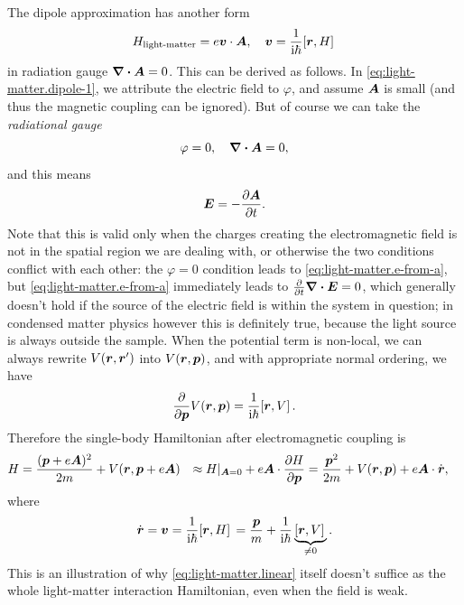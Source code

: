 \documentclass[hyperref, a4paper, 12pt]{report}
\newcommand*{\ii}{\mathrm{i}}
\def\\{}%
\begin{document}
The dipole approximation has another form
\begin{equation}
    H_{\text{light-matter}} = e \vb*{v} \cdot \vb*{A}, 
    \quad \vb*{v} = \frac{1}{\ii \hbar} \comm*{\vb*{r}}{H} 
\end{equation}
in radiation gauge $\div{\vb*{A}} = 0$.
This can be derived as follows. 
In \eqref{eq:light-matter.dipole-1}, 
we attribute the electric field to $\varphi$, 
and assume $\vb*{A}$ is small (and thus the magnetic coupling can be ignored).
But of course we can take the \emph{radiational gauge} 
\begin{equation}
    \varphi = 0, \quad \div{\vb*{A}} = 0,
\end{equation} 
and this means 
\begin{equation}
    \vb*{E} = - \pdv{\vb*{A}}{t}.
    \label{eq:light-matter.e-from-a}
\end{equation}
Note that this is valid only when 
the charges creating the electromagnetic field 
is not in the spatial region we are dealing with,
or otherwise the two conditions conflict with each other: 
the $\varphi = 0$ condition leads to \eqref{eq:light-matter.e-from-a}, 
but \eqref{eq:light-matter.e-from-a} immediately leads to $\pdv{t} \div{\vb*{E}} = 0$, 
which generally doesn't hold if the source of the electric field 
is within the system in question; 
in condensed matter physics however this is definitely true, 
because the light source is always outside the sample.
When the potential term is non-local, 
we can always rewrite $V(\vb*{r}, \vb*{r}')$
into $V(\vb*{r}, \vb*{p})$,
and with appropriate normal ordering, we have 
\[
    \pdv{\vb*{p}} V(\vb*{r}, \vb*{p}) = \frac{1}{\ii \hbar} \comm*{\vb*{r}}{V}.
\]
Therefore the single-body Hamiltonian after electromagnetic coupling is 
\[
    \begin{aligned}
        H &= \frac{(\vb*{p} + e \vb*{A})^2}{2m} 
            + V(\vb*{r} , \vb*{p} + e \vb*{A}) \\
        &\approx H|_{\vb*{A} = 0} + 
            e \vb*{A} \cdot \pdv{H}{\vb*{p}} \\
        &= \frac{\vb*{p}^2}{2m} + V(\vb*{r}, \vb*{p}) + e \vb*{A} \cdot \dot{\vb*{r}},
    \end{aligned}
\]
where 
\begin{equation}
    \dot{\vb*{r}} = \vb*{v} = \frac{1}{\ii \hbar} \comm*{\vb*{r}}{H} 
    = \frac{\vb*{p}}{m} 
    + \frac{1}{\ii \hbar} \underbrace{\comm*{\vb*{r}}{V}}_{\neq 0}.
\end{equation}
This is an illustration of 
why \eqref{eq:light-matter.linear} itself 
doesn't suffice as the whole light-matter interaction Hamiltonian, 
even when the field is weak.
\end{document}
